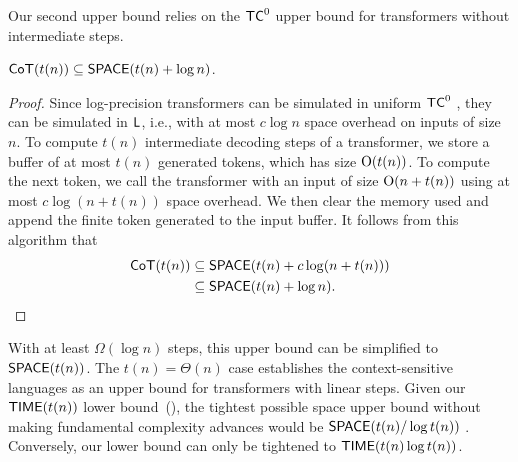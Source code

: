 \documentclass{article} %
\begin{document}

Our second upper bound relies on the $\mathsf{TC}^0$ upper bound for transformers without intermediate steps.

\begin{theorem} \label{thm:space-ub}
    $\mathsf{CoT}(t(n)) \subseteq \mathsf{SPACE}(t(n) + \log n)$.
\end{theorem}

\begin{proof}
    Since log-precision transformers can be simulated in uniform $\mathsf{TC}^0$ \citep{merrill2023parallelism}, they can be simulated in $\mathsf L$, i.e., with at most $c \log n$ space overhead on inputs of size $n$.
% 
    To compute $t(n)$ intermediate decoding steps of a transformer, we store a buffer of at most $t(n)$ generated tokens, which has size $\mathrm{O}(t(n))$. To compute the next token, we call the transformer with an input of size $\mathrm{O}(n + t(n))$ using at most $c \log(n + t(n))$ space overhead.
    We then clear the memory used and append the finite token generated to the input buffer.
    It follows from this algorithm that
    \begin{align*}
        \mathsf{CoT}(t(n)) &\subseteq \mathsf{SPACE}(t(n) + c \log(n + t(n))) \\
        &\subseteq \mathsf{SPACE}(t(n) + \log n) . \qedhere
    \end{align*}
\end{proof}

With at least $\Omega(\log n)$ steps, this upper bound can be simplified to $\mathsf{SPACE}(t(n))$.
The $t(n) = \Theta(n)$ case establishes the context-sensitive languages as an upper bound for transformers with linear steps.
Given our $\mathsf{TIME}(t(n))$ lower bound~(), the tightest possible space upper bound without making fundamental complexity advances would be $\mathsf{SPACE}(t(n) / \log t(n))$ \citep{Hopcroft1977OnTV}. Conversely, our lower bound can only be tightened to $\mathsf{TIME}(t(n) \log t(n))$.
\end{document}
